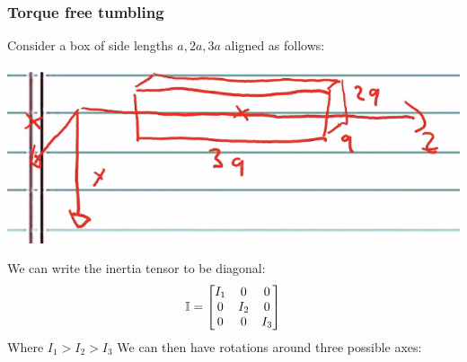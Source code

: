 \documentclass[../PHYS306Notes.tex]{subfiles}
\begin{document}
\subsubsection{Torque free tumbling}
Consider a box of side lengths $a, 2a, 3a$ aligned as follows:
\begin{center}
    \includegraphics[scale=0.7]{Lecture-19/l19-img2.png}
\end{center}
We can write the inertia tensor to be diagonal:
\[\mathbb{I} = \begin{bmatrix}I_1 & 0 & 0 \\ 0 & I_2 & 0 \\ 0 & 0 & I_3\end{bmatrix}\]
Where $I_1 > I_2 > I_3$ We can then have rotations around three possible axes:
\end{document}
